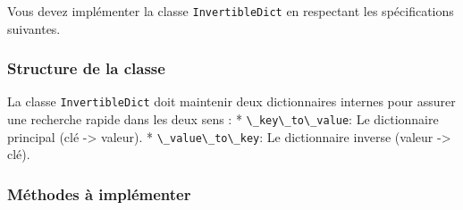 \documentclass[12pt,a4paper]{report}
\newcommand{\passthrough}[1]{#1}
\begin{document}
Vous devez implémenter la classe
\passthrough{\lstinline!InvertibleDict!} en respectant les
spécifications suivantes.

\subsubsection{Structure de la classe}\label{structure-de-la-classe}

La classe \passthrough{\lstinline!InvertibleDict!} doit maintenir deux
dictionnaires internes pour assurer une recherche rapide dans les deux
sens : * \passthrough{\lstinline!\_key\_to\_value!}: Le dictionnaire
principal (clé -\textgreater{} valeur). *
\passthrough{\lstinline!\_value\_to\_key!}: Le dictionnaire inverse
(valeur -\textgreater{} clé).

\subsubsection{Méthodes à
implémenter}\label{muxe9thodes-uxe0-impluxe9menter}
\end{document}
